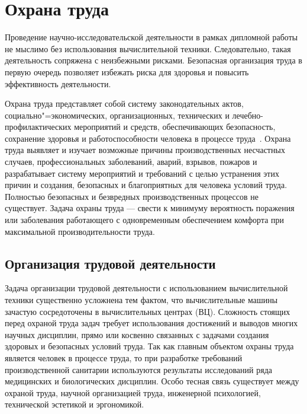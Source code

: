 
\clearpage
\section{Охрана труда}
\label{sec:bgd}
 Проведение научно-исследовательской деятельности в рамках дипломной работы не мыслимо без использования вычислительной техники. Следовательно, такая деятельность сопряжена с неизбежными рисками. Безопасная организация труда в первую очередь позволяет избежать риска для здоровья и повысить эффективность деятельности.\par{}

Охрана труда представляет собой систему законодательных актов, социально"=экономических, организационных, технических и лечебно-профилактических мероприятий и средств, обеспечивающих безопасность, сохранение здоровья и работоспособности человека в процессе труда~\cite{BGDEvd1993}. Охрана труда выявляет и изучает возможные причины производственных несчастных случаев, профессиональных заболеваний, аварий, взрывов, пожаров и разрабатывает систему мероприятий и требований с целью устранения этих причин и создания, безопасных и благоприятных для человека условий труда. Полностью безопасных и безвредных производственных процессов не существует. Задача охраны труда --- свести к минимуму вероятность поражения или заболевания работающего с одновременным обеспечением комфорта при максимальной производительности труда.

\subsection{Организация трудовой деятельности}
\label{sec:bgd:trud}
Задача организации трудовой деятельности с использованием вычислительной техники существенно усложнена тем фактом, что вычислительные машины зачастую сосредоточены в вычислительных центрах (ВЦ). Сложность стоящих перед охраной труда задач требует использования достижений и выводов многих научных дисциплин, прямо или косвенно связанных с задачами создания здоровых и безопасных условий труда. Так как главным объектом охраны труда является человек в процессе труда, то при разработке требований производственной санитарии используются результаты исследований ряда медицинских и биологических дисциплин. Особо тесная связь существует между охраной труда, научной организацией труда, инженерной психологией, технической эстетикой и эргономикой.

